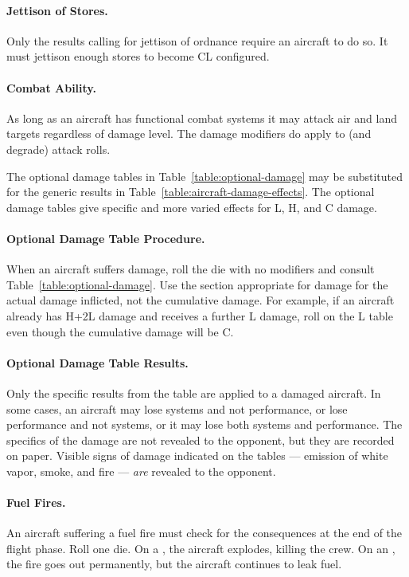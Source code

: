 \begin{advancedrules}
{\paragraph{Jettison of Stores.} Only the results calling for jettison of ordnance require an aircraft to do so. It must jettison enough stores to become CL configured.

\paragraph{Combat Ability.} As long as an aircraft has functional combat systems it may attack air and land targets regardless of damage level. The damage modifiers do apply to (and degrade) attack rolls.

}{

The optional damage tables in Table~\ref{table:optional-damage} may be substituted for the generic results in Table~\ref{table:aircraft-damage-effects}. The optional damage tables give specific and more varied effects for L, H, and C damage. 

\paragraph{Optional Damage Table Procedure.}
When an aircraft suffers damage, roll the die with no modifiers and consult Table~\ref{table:optional-damage}. Use the section appropriate for damage for the actual damage inflicted, not the cumulative damage. For example, if an aircraft already has H+2L damage and receives a further L damage, roll on the L table even though the cumulative damage will be C.

\paragraph{Optional Damage Table Results.} Only the specific results from the table are applied to a damaged aircraft. In some cases, an aircraft may lose systems and not performance, or lose performance and not systems, or it may lose both systems and performance. The specifics of the damage are not revealed to the opponent, but they are recorded on paper. Visible signs of damage indicated on the tables --- emission of white vapor, smoke, and fire --- \emph{are} revealed to the opponent.

\paragraph{Fuel Fires.} 
An aircraft suffering a fuel fire must check for the consequences at the end of the flight phase. Roll one die. On a , the aircraft explodes, killing the crew. On an , the fire goes out permanently, but the aircraft continues to leak fuel.

}
\end{advancedrules}
